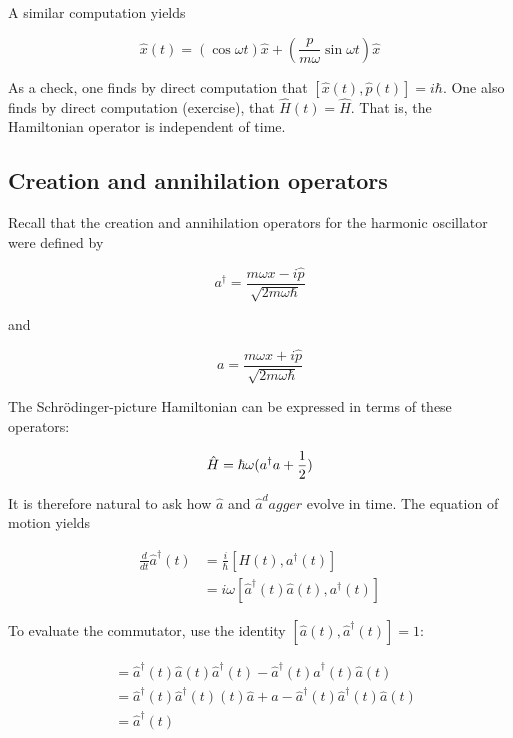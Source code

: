 A similar computation yields

\begin{equation}
\hat x(t) = (\cos\omega t) \hat x +  \left(\frac{p}{m\omega} \sin \omega t\right) \hat x
\end{equation}

As a check, one finds by direct computation that  $[\hat x(t), \hat p(t)] = i\hbar$. One also finds by direct computation (exercise), that $\hat H(t) = \hat H$.  That is, the Hamiltonian operator is independent of time.




\subsection{Creation and annihilation operators}

Recall that the creation and annihilation operators for the harmonic oscillator were defined by

\begin{equation}
\label{creationop2}
a^\dagger = \frac{m\omega x - i\hat p}{\sqrt{2m\omega\hbar}}
\end{equation}

and

\begin{equation}
\label{annihilationop2}
a = \frac{m\omega x + i\hat p}{\sqrt{2m\omega\hbar}}
\end{equation}

The  Schrödinger-picture Hamiltonian can be expressed in terms of these operators:

\begin{equation}
\hat H = \hbar \omega(a^\dagger a + \small{\frac{1}{2}})
\end{equation}

It is therefore natural to ask how $\hat a$ and $\hat a^dagger$ evolve in time. The equation of motion yields

\begin{align}
\frac{d}{dt}\hat a^\dagger(t) &= \frac{i}{\hbar}[H(t), a^\dagger(t)] \\
&= i\omega [\hat a^\dagger(t) \hat a(t), a^\dagger(t)]
\end{align}

To evaluate the commutator, use the identity $[\hat a(t), \hat a^\dagger(t)] = 1$:

\begin{align}
[\hat a^\dagger(t) \hat a(t), a^\dagger(t)]
 &= \hat a^\dagger(t) \hat a(t) \hat a^\dagger(t) -
\hat a^\dagger(t) \hat a^\dagger(t) \hat a(t) \\
&= \hat a^\dagger(t) \hat a^\dagger(t)(t) \hat a
 + a -
\hat a^\dagger(t) \hat a^\dagger(t) \hat a(t) \\
&= \hat a^\dagger(t)
\end{align}

